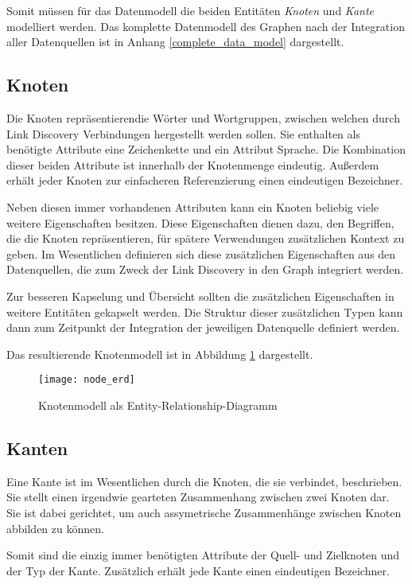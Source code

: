 Somit müssen für das Datenmodell die beiden Entitäten \emph{Knoten} und \emph{Kante} modelliert werden.
Das komplette Datenmodell des Graphen nach der Integration aller Datenquellen ist in Anhang \ref{complete_data_model} dargestellt.

\subsection{Knoten}

Die Knoten repräsentierendie Wörter und Wortgruppen, zwischen welchen durch Link Discovery Verbindungen hergestellt werden sollen. Sie enthalten als benötigte Attribute eine Zeichenkette und ein Attribut Sprache. Die Kombination dieser beiden Attribute ist innerhalb der Knotenmenge eindeutig. Außerdem erhält jeder Knoten zur einfacheren Referenzierung einen eindeutigen Bezeichner.

Neben diesen immer vorhandenen Attributen kann ein Knoten beliebig viele weitere Eigenschaften besitzen. Diese Eigenschaften dienen dazu, den Begriffen, die die Knoten repräsentieren, für spätere Verwendungen zusätzlichen Kontext zu geben. Im Wesentlichen definieren sich diese zusätzlichen Eigenschaften aus den Datenquellen, die zum Zweck der Link Discovery in den Graph integriert werden.

Zur besseren Kapselung und Übersicht sollten die zusätzlichen Eigenschaften in weitere Entitäten gekapselt werden. Die Struktur dieser zusätzlichen Typen kann dann zum Zeitpunkt der Integration der jeweiligen Datenquelle definiert werden.

Das resultierende Knotenmodell ist in Abbildung \ref{fig:node_erd} dargestellt.

\begin{figure}
\centering
\texttt{[image: node\_erd]}
\caption{Knotenmodell als Entity-Relationship-Diagramm}
\label{fig:node_erd}
\end{figure}

\subsection{Kanten}

Eine Kante ist im Wesentlichen durch die Knoten, die sie verbindet, beschrieben. Sie stellt einen irgendwie gearteten Zusammenhang zwischen zwei Knoten dar. Sie ist dabei gerichtet, um auch assymetrische Zusammenhänge zwischen Knoten abbilden zu können.

Somit sind die einzig immer benötigten Attribute der Quell- und Zielknoten und der Typ der Kante. Zusätzlich erhält jede Kante einen eindeutigen Bezeichner.

